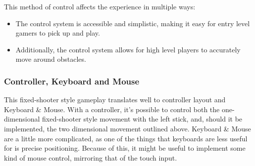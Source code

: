 \documentclass{scrartcl}
\begin{document}
This method of control affects the experience in multiple ways:

\begin{itemize}
  \item The control system is accessible and simplistic, making it easy for entry level gamers to pick up and play.
  \item Additionally, the control system allows for high level players to accurately move around obstacles.
\end{itemize}

\subsubsection{Controller, Keyboard and Mouse}

This fixed-shooter style gameplay translates well to controller layout and Keyboard \& Mouse. With a controller, it's possible to control both the one-dimensional fixed-shooter style movement with the left stick, and, should it be implemented, the two dimensional movement outlined above. Keyboard \& Mouse are a little more complicated, as one of the things that keyboards are less useful for is precise positioning. Because of this, it might be useful to implement some kind of mouse control, mirroring that of the touch input.

\printbibliography
\end{document}
